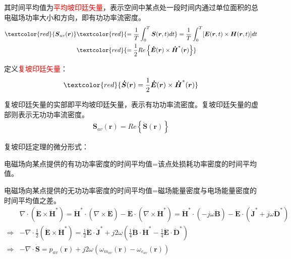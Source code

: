 \documentclass[withoutpreface,bwprint]{cumcmthesis} %
\begin{document}
其时间平均值为\textcolor{red}{平均坡印廷矢量}，表示空间中某点处一段时间内通过单位面积的总电磁场功率大小和方向，即有功功率流密度。
\begin{align}
    \textcolor{red}{\boldsymbol{S}_{av}(\boldsymbol{r})} &\textcolor{red}{ = \frac{1}{T}\int_0^T \boldsymbol{S}(\boldsymbol{r},t)dt} = \frac{1}{T}\int_0^T [\boldsymbol{E}(\boldsymbol{r},t) \times \boldsymbol{H}(\boldsymbol{r},t)]dt \\
    &\textcolor{red}{ = \frac{1}{2}Re\left\{\boldsymbol{\dot{E}}(\boldsymbol{r})\times \boldsymbol{\dot{H}}^{*}(\boldsymbol{r})\right\}}
\end{align}

定义\textcolor{red}{复坡印廷矢量}：
\begin{align}
    \textcolor{red}{\boldsymbol{\dot{S}}(\boldsymbol{r}) = \frac{1}{2}\boldsymbol{\dot{E}}(\boldsymbol{r})\times \boldsymbol{\dot{H}}^{*}(\boldsymbol{r})}
\end{align}

复坡印廷矢量的实部即平均坡印廷矢量，表示有功功率流密度。复坡印廷矢量的虚部则表示无功功率流密度。
\begin{align}
    \boldsymbol{S}_{av}(\boldsymbol{r}) = Re\left\{\boldsymbol{\dot{S}}(\boldsymbol{r})\right\}
\end{align}

复坡印廷定理的微分形式：

电磁场向某点提供的有功功率密度的时间平均值=该点处损耗功率密度的时间平均值。

电磁场向某点提供的无功功率密度的时间平均值=磁场能量密度与电场能量密度的时间平均值之差。
\begin{align}
    &\nabla \cdot (\boldsymbol{\dot{E}}\times \boldsymbol{\dot{H}^*}) 
    = \boldsymbol{\dot{H}^*}\cdot (\nabla \times \boldsymbol{\dot{E}}) - \boldsymbol{\dot{E}}\cdot (\nabla \times \boldsymbol{\dot{H}^*}) 
    = \boldsymbol{\dot{H}^*}\cdot (-j\omega \boldsymbol{\dot{B}}) - \boldsymbol{\dot{E}}\cdot (\boldsymbol{\dot{J}^*} + j\omega \boldsymbol{\dot{D}^*})\nonumber \\
    \Rightarrow &-\nabla \cdot \frac{1}{2}(\boldsymbol{\dot{E}}\times \boldsymbol{\dot{H}}^*) = \frac{1}{2}\boldsymbol{\dot{E}}\cdot \boldsymbol{\dot{J}}^* + j2\omega (\frac{1}{4}\boldsymbol{\dot{B}}\cdot \boldsymbol{\dot{H}}^* - \frac{1}{4}\boldsymbol{\dot{E}}\cdot \boldsymbol{\dot{D}}^*)\\
    \Rightarrow &-\nabla \cdot \boldsymbol{\dot{S}} = p_{av}(\boldsymbol{r}) + j2\omega (\omega_{m_{av}}(\boldsymbol{r}) - \omega_{e_{av}}(\boldsymbol{r}))
\end{align}
\end{document}
